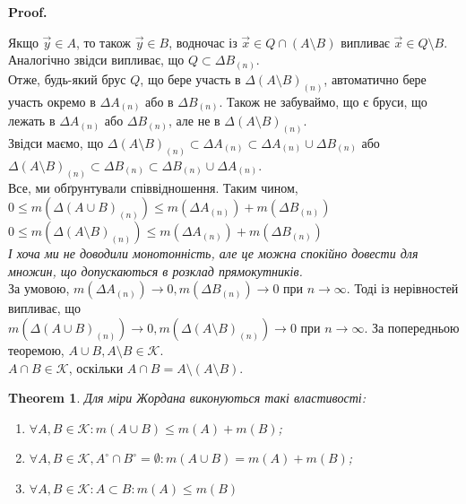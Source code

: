 \documentclass[a4paper, 10pt]{article}
\makeatletter
\def\qed{$\blacksquare$}
\theoremstyle{theoremdd}
\newtheorem{theorem}{Theorem}[subsection]
\theoremstyle{theoremdd}
\theoremstyle{theoremdd}
\theoremstyle{theoremdd}
\theoremstyle{theoremdd}
\theoremstyle{theoremdd}
\theoremstyle{theoremdd}
\theoremstyle{theoremdd}
\renewenvironment{proof}[1][Proof.\\]{\par
\pushQED{\hfill \qed}%
\normalfont \topsep6\p@\@plus6\p@\relax
\trivlist
\item\relax
{\bfseries
#1\@addpunct{.}}\hspace\labelsep\ignorespaces
}{%
\popQED\endtrivlist\@endpefalse
}
\makeatother
\begin{document}
\begin{proof}
Якщо $\vec{y} \in A$, то також $\vec{y} \in B$, водночас із $\vec{x} \in Q \cap (A \setminus B)$ випливає $\vec{x} \in Q \setminus B$. Аналогічно звідси випливає, що $Q \subset \Delta B_{(n)}$.\\
Отже, будь-який брус $Q$, що бере участь в $\Delta (A \setminus B)_{(n)}$, автоматично бере участь окремо в $\Delta A_{(n)}$ або в $\Delta B_{(n)}$. Також не забуваймо, що є бруси, що лежать в $\Delta A_{(n)}$ або $\Delta B_{(n)}$, але не в $\Delta (A \setminus B)_{(n)}$.\\
Звідси маємо, що $\Delta (A \setminus B)_{(n)} \subset \Delta A_{(n)} \subset \Delta A_{(n)} \cup \Delta B_{(n)}$ або $\Delta (A \setminus B)_{(n)} \subset \Delta B_{(n)} \subset \Delta B_{(n)} \cup \Delta A_{(n)}$.
\bigskip \\
Все, ми обґрунтували співвідношення. Таким чином,\\
$0 \leq m(\Delta (A \cup B)_{(n)}) \leq m(\Delta A_{(n)}) + m(\Delta B_{(n)})$\\
$0 \leq m(\Delta (A \setminus B)_{(n)}) \leq m(\Delta A_{(n)}) + m(\Delta B_{(n)})$\\
\textit{І хоча ми не доводили монотонність, але це можна спокійно довести для множин, що допускаються в розклад прямокутників.}\\
За умовою, $m(\Delta A_{(n)}) \to 0, m(\Delta B_{(n)}) \to 0$ при $n \to \infty$. Тоді із нерівностей випливає, що \\ $m(\Delta (A \cup B)_{(n)}) \to 0, m(\Delta (A \setminus B)_{(n)}) \to 0$ при $n \to \infty$. За попередньою теоремою, $A \cup B, A \setminus B \in \mathcal{K}$.\\
$A \cap B \in \mathcal{K}$, оскільки $A \cap B = A \setminus (A \setminus B)$.
\end{proof}

\begin{theorem}
Для міри Жордана виконуються такі властивості:
\begin{enumerate}
\item $\forall A,B \in \mathcal{K}: m(A \cup B) \leq m(A) + m(B)$;
\item $\forall A,B \in \mathcal{K}, A^\circ \cap B^\circ = \emptyset: m(A \cup B) = m(A) + m(B)$;
\item $\forall A,B \in \mathcal{K}: A \subset B: m(A) \leq m(B)$
\end{enumerate}
\end{theorem}
\end{document}

